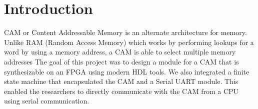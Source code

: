 \section{Introduction}
CAM or Content Addressable Memory is an alternate architecture for memory. Unlike RAM (Random Access Memory) which works by performing lookups for a word by using a memory address, a CAM is able to select multiple memory addresses 
The goal of this project was to design a module for a CAM that is synthesizable on an FPGA using modern HDL tools. 
We also integrated a finite state machine that encapsulated the CAM and a Serial UART module. 
This enabled the researchers to directly communicate with the CAM from a CPU using serial communication. 

